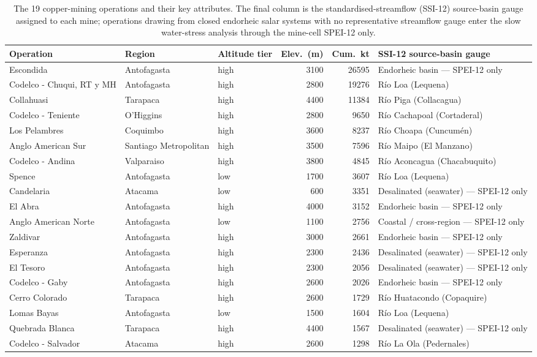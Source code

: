 \begin{table}[H]
\centering
\caption{The 19 copper-mining operations and their key attributes. The final column is the standardised-streamflow (SSI-12) source-basin gauge assigned to each mine; operations drawing from closed endorheic salar systems with no representative streamflow gauge enter the slow water-stress analysis through the mine-cell SPEI-12 only.}
\label{tab:mines}
\footnotesize
\begin{tabular}{lllrrl}
\toprule
\textbf{Operation} & \textbf{Region} & \textbf{Altitude tier} & \textbf{Elev.\ (m)} & \textbf{Cum.\ kt} & \textbf{SSI-12 source-basin gauge} \\
\midrule
Escondida & Antofagasta & high & 3100 & 26595 & Endorheic basin --- SPEI-12 only \\
Codelco - Chuqui, RT y MH & Antofagasta & high & 2800 & 19276 & R\'io Loa (Lequena) \\
Collahuasi & Tarapaca & high & 4400 & 11384 & R\'io Piga (Collacagua) \\
Codelco - Teniente & O'Higgins & high & 2800 &  9650 & R\'io Cachapoal (Cortaderal) \\
Los Pelambres & Coquimbo & high & 3600 &  8237 & R\'io Choapa (Cuncum\'en) \\
Anglo American Sur & Santiago Metropolitan & high & 3500 &  7596 & R\'io Maipo (El Manzano) \\
Codelco - Andina & Valparaiso & high & 3800 &  4845 & R\'io Aconcagua (Chacabuquito) \\
Spence & Antofagasta & low & 1700 &  3607 & R\'io Loa (Lequena) \\
Candelaria & Atacama & low &  600 &  3351 & Desalinated (seawater) --- SPEI-12 only \\
El Abra & Antofagasta & high & 4000 &  3152 & Endorheic basin --- SPEI-12 only \\
Anglo American Norte & Antofagasta & low & 1100 &  2756 & Coastal / cross-region --- SPEI-12 only \\
Zaldivar & Antofagasta & high & 3000 &  2661 & Endorheic basin --- SPEI-12 only \\
Esperanza & Antofagasta & high & 2300 &  2436 & Desalinated (seawater) --- SPEI-12 only \\
El Tesoro & Antofagasta & high & 2300 &  2056 & Desalinated (seawater) --- SPEI-12 only \\
Codelco - Gaby & Antofagasta & high & 2600 &  2026 & Endorheic basin --- SPEI-12 only \\
Cerro Colorado & Tarapaca & high & 2600 &  1729 & R\'io Huatacondo (Copaquire) \\
Lomas Bayas & Antofagasta & low & 1500 &  1604 & R\'io Loa (Lequena) \\
Quebrada Blanca & Tarapaca & high & 4400 &  1567 & Desalinated (seawater) --- SPEI-12 only \\
Codelco - Salvador & Atacama & high & 2600 &  1298 & R\'io La Ola (Pedernales) \\
\bottomrule
\end{tabular}
\end{table}

